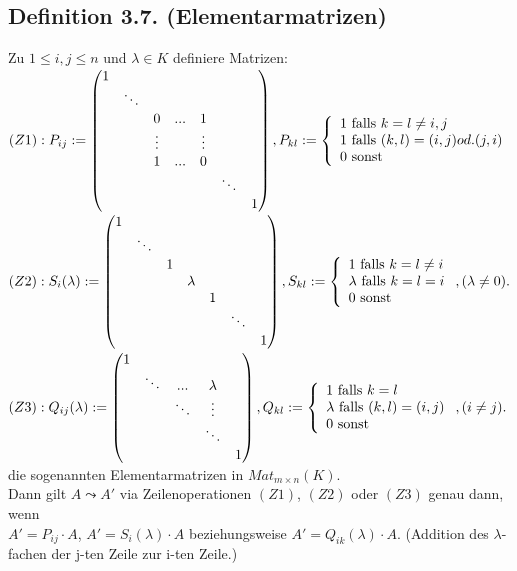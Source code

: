\documentclass[a4paper, 12pt]{extarticle}
\newcommand{\tn}[1]{\textnormal {#1}}
\begin{document}
\subsection*{Definition 3.7. (Elementarmatrizen)}
Zu $1 \leq i,j \leq n$ und $\lambda \in K$ definiere Matrizen:\\
$(Z1): P_{ij} := \left( \begin{matrix} 
1 \\
& \ddots \\
& & 0 & ... & 1 \\
& & \vdots & & \vdots \\
& & 1 & ... & 0 \\
& & & & & \ddots \\
& & & & & & 1 \\
\end{matrix} \right), 
P_{kl} := \left \{\begin{array}{ll} 1 \tn{ falls } k = l \neq i,j \\
1 \tn{ falls } (k,l) = (i,j) od. (j,i) \\
0 \tn{ sonst}\\
\end{array} \right.$\\
$(Z2): S_i(\lambda):= \left(\begin{matrix}
1 \\
& \ddots \\
& & 1 \\
& & & \lambda \\
& & & & 1 \\
& & & & & \ddots \\
& & & & & & 1 \\
\end{matrix} \right) ,
S_{kl} := \left \{\begin{array}{ll}
1 \tn{ falls } k = l \neq i \\
\lambda \tn{ falls } k = l = i \\
0 \tn{ sonst }
\end{array}\right. , (\lambda \neq 0).
$\\
$(Z3): Q_{ij}(\lambda) := \left(\begin{matrix}
1 \\
& \ddots & . . . & \lambda \\
& & \ddots & \vdots \\
& & &  \ddots \\
& & & &  1 \\
\end{matrix} \right) , Q_{kl} := \left \{ \begin{array}{ll}
1 \tn{ falls } k=l \\
\lambda \tn{ falls } (k,l) = (i,j)\\
0 \tn{ sonst}
\end{array} \right. , (i\neq j).
$\\
die sogenannten Elementarmatrizen in $Mat_{m \times n}(K)$.\\
Dann gilt $A \leadsto A'$ via Zeilenoperationen $(Z1)$, $(Z2)$ oder $(Z3)$ genau dann, wenn\\ 
$A' = P_{ij} \cdot A$, $A' = S_i(\lambda) \cdot A$ beziehungsweise $A' = Q_{ik}(\lambda) \cdot A$. (Addition des $\lambda$-fachen der j-ten Zeile zur i-ten Zeile.)
\end{document}

